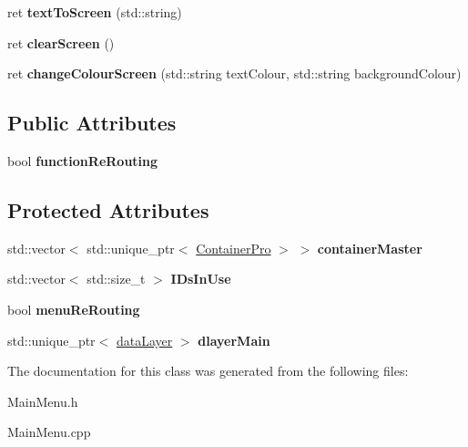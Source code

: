 \begin{DoxyCompactItemize}
\item 
\hypertarget{class_menu_ac9c5a9acc58f2dcfda1c0374ff5d059a}{}ret {\bfseries text\+To\+Screen} (std\+::string)\label{class_menu_ac9c5a9acc58f2dcfda1c0374ff5d059a}

\item 
\hypertarget{class_menu_ae440e664bba088b2a51b1a9f9b45bc52}{}ret {\bfseries clear\+Screen} ()\label{class_menu_ae440e664bba088b2a51b1a9f9b45bc52}

\item 
\hypertarget{class_menu_ae20292c63ff80e9fd55bd7f3da3de9c3}{}ret {\bfseries change\+Colour\+Screen} (std\+::string text\+Colour, std\+::string background\+Colour)\label{class_menu_ae20292c63ff80e9fd55bd7f3da3de9c3}

\end{DoxyCompactItemize}
\subsection*{Public Attributes}
\begin{DoxyCompactItemize}
\item 
\hypertarget{class_menu_ae0bc1a7abf7469533d70c7efe7676ff1}{}bool {\bfseries function\+Re\+Routing}\label{class_menu_ae0bc1a7abf7469533d70c7efe7676ff1}

\end{DoxyCompactItemize}
\subsection*{Protected Attributes}
\begin{DoxyCompactItemize}
\item 
\hypertarget{class_menu_a0a269ec893fdccaa41495b4ae38b89d5}{}std\+::vector$<$ std\+::unique\+\_\+ptr$<$ \hyperlink{class_container_pro}{Container\+Pro} $>$ $>$ {\bfseries container\+Master}\label{class_menu_a0a269ec893fdccaa41495b4ae38b89d5}

\item 
\hypertarget{class_menu_a4b75ebb003da66c0e1be06c3395198ec}{}std\+::vector$<$ std\+::size\+\_\+t $>$ {\bfseries I\+Ds\+In\+Use}\label{class_menu_a4b75ebb003da66c0e1be06c3395198ec}

\item 
\hypertarget{class_menu_a778e0ea473da60e0bac7985e4d443b8b}{}bool {\bfseries menu\+Re\+Routing}\label{class_menu_a778e0ea473da60e0bac7985e4d443b8b}

\item 
\hypertarget{class_menu_a6c2c6233e8210fd92ba079eabd5290ff}{}std\+::unique\+\_\+ptr$<$ \hyperlink{classdata_layer}{data\+Layer} $>$ {\bfseries dlayer\+Main}\label{class_menu_a6c2c6233e8210fd92ba079eabd5290ff}

\end{DoxyCompactItemize}


The documentation for this class was generated from the following files\+:\begin{DoxyCompactItemize}
\item 
Main\+Menu.\+h\item 
Main\+Menu.\+cpp\end{DoxyCompactItemize}
